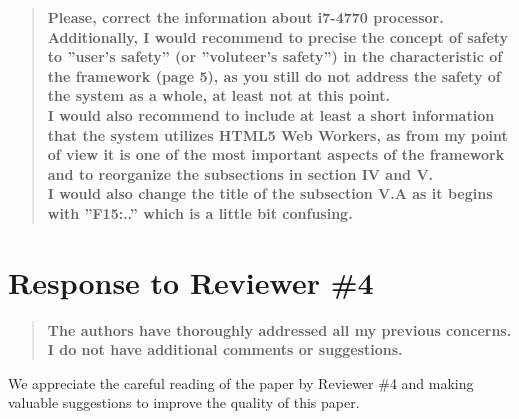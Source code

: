 \documentclass[preprint]{elsarticle}
\begin{document}
\begin{quote}
\textbf{Please, correct the information about i7-4770 processor. Additionally, I would recommend to precise the concept of safety to ''user's safety'' (or ''voluteer's safety'') in the characteristic of the framework (page 5), as you still do not address the safety of the system as a whole, at least not at this point.\\
I would also recommend to include at least a short information that the system utilizes HTML5 Web Workers, as from my point of view it is one of the most important aspects of the framework and to reorganize the subsections in section IV and V. \\
I would also change the title of the subsection V.A as it begins with ''F15:..'' which is a little bit confusing.}
\end{quote}



\section{Response to Reviewer \#4}

\begin{quote}\textbf{
The authors have thoroughly addressed all my previous concerns. I do not have additional comments or suggestions.
}\end{quote}

We appreciate the careful reading of the paper by Reviewer \#4 and making valuable suggestions to improve the quality of this paper.




\end{document}
